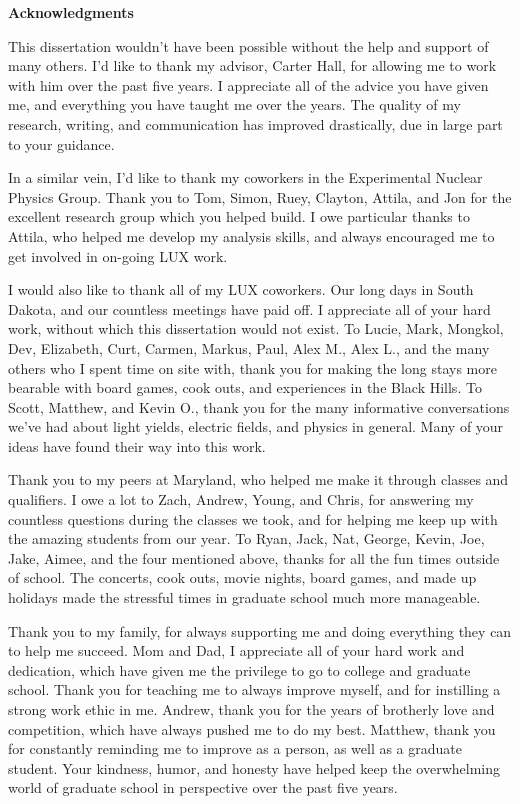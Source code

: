 \newpage
\thispagestyle{plain}
    
    \Large
    \textbf{Acknowledgments}

	\vspace{1cm}

	\normalsize

    This dissertation wouldn't have been possible without the help and support of many others.  I'd like to thank my advisor, Carter Hall, for allowing me to work with him over the past five years.  I appreciate all of the advice you have given me, and everything you have taught me over the years.  The quality of my research, writing, and communication has improved drastically, due in large part to your guidance.

In a similar vein, I'd like to thank my coworkers in the Experimental Nuclear Physics Group.  Thank you to Tom, Simon, Ruey, Clayton, Attila, and Jon for the excellent research group which you helped build.  I owe particular thanks to Attila,  who helped me develop my analysis skills, and always encouraged me to get involved in on-going LUX work. 
    
I would also like to thank all of my LUX coworkers.  Our long days in South Dakota, and our countless meetings have paid off.  I appreciate all of your hard work, without which this dissertation would not exist.  To Lucie, Mark, Mongkol, Dev, Elizabeth, Curt, Carmen, Markus, Paul, Alex M., Alex L., and the many others who I spent time on site with, thank you for making the long stays more bearable with board games, cook outs, and experiences in the Black Hills.  To Scott, Matthew, and Kevin O., thank you for the many informative conversations we've had about light yields, electric fields, and physics in general.  Many of your ideas have found their way into this work.

Thank you to my peers at Maryland, who helped me make it through classes and qualifiers.  I owe a lot to Zach, Andrew, Young, and Chris, for answering my countless questions during the classes we took, and for helping me keep up with the amazing students from our year.  To Ryan, Jack, Nat, George, Kevin, Joe, Jake, Aimee, and the four mentioned above, thanks for all the fun times outside of school.  The concerts, cook outs, movie nights, board games, and made up holidays made the stressful times in graduate school much more manageable.  

Thank you to my family, for always supporting me and doing everything they can to help me succeed.  Mom and Dad, I appreciate all of your hard work and dedication, which have given me the privilege to go to college and graduate school.  Thank you for teaching me to always improve myself, and for instilling a strong work ethic in me.  Andrew, thank you for the years of brotherly love and competition, which have always pushed me to do my best.  Matthew, thank you for constantly reminding me to improve as a person, as well as a graduate student.  Your kindness, humor, and honesty have helped keep the overwhelming world of graduate school in perspective over the past five years.
 
